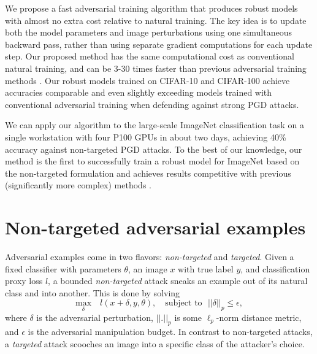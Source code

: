 \documentclass{article}
\begin{document}
We propose a fast adversarial training algorithm that produces robust models with almost no extra cost relative to natural training. The key idea is to update both the model parameters and image perturbations using one simultaneous backward pass, rather than using separate gradient computations for each update step. 
Our proposed method has the same computational cost as conventional natural training, and can be 3-30 times faster than previous adversarial training methods \citep{madry2017towards,xie2018feature}. 
Our robust models trained on CIFAR-10 and CIFAR-100 achieve accuracies comparable and even slightly exceeding models trained with conventional adversarial training when defending against strong PGD attacks. 

We can apply our algorithm to the large-scale ImageNet classification task on a single workstation with four P100 GPUs in about two days, achieving 40\% accuracy against non-targeted PGD attacks. To the best of our knowledge, our method is the first to successfully train a robust model for ImageNet based on the non-targeted formulation and achieves results competitive with previous (significantly more complex) methods \citep{kannan2018adversarial,xie2018feature}. 

\section{Non-targeted adversarial examples}\label{sec:adv_generation}

 Adversarial examples come in two flavors: \emph{non-targeted} and \emph{targeted}. Given a fixed classifier with parameters $\theta$, an image $x$ with true label $y$, and classification proxy loss $l$, a bounded {\em non-targeted} attack sneaks an example out of its natural class and into another. This is done by solving
\begin{equation}
      \underset{\delta}{\mathrm{max}} \quad l(x+\delta,y,\theta), \quad
    \text{subject to }\,\,||\delta||_{p} \leq \epsilon, \label{eq:adv_opt_untargeted}
\end{equation}
where $\delta$ is the adversarial perturbation, $||.||_{p}$ is some $\ell_p$-norm distance metric, and $\epsilon$ is the adversarial manipulation budget. 
In contrast to non-targeted attacks, a {\em targeted} attack scooches an image into a specific class of the attacker's choice. 
\end{document}
